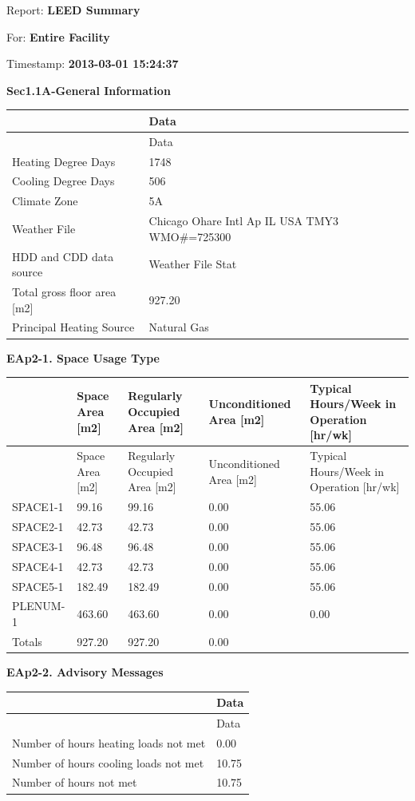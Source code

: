 Report: \textbf{LEED Summary}

For: \textbf{Entire Facility}

Timestamp: \textbf{2013-03-01 15:24:37}

\textbf{Sec1.1A-General Information}

\begin{longtable}[c]{>{\raggedright}p{2.21in}>{\raggedright}p{3.78in}}
\toprule
 & Data \tabularnewline
\midrule
\endfirsthead

\toprule
 & Data \tabularnewline
\midrule
\endhead

Heating Degree Days & 1748 \tabularnewline
Cooling Degree Days & 506 \tabularnewline
Climate Zone & 5A \tabularnewline
Weather File & Chicago Ohare Intl Ap IL USA TMY3 WMO\#=725300 \tabularnewline
HDD and CDD data source & Weather File Stat \tabularnewline
Total gross floor area [m2] & 927.20 \tabularnewline
Principal Heating Source & Natural Gas \tabularnewline
\bottomrule
\end{longtable}

\textbf{EAp2-1. Space Usage Type}

\begin{longtable}[c]{>{\raggedright}p{1.2in}>{\raggedright}p{1.2in}>{\raggedright}p{1.2in}>{\raggedright}p{1.2in}>{\raggedright}p{1.2in}}
\toprule
 & Space Area [m2] & Regularly Occupied Area [m2] & Unconditioned Area [m2] & Typical Hours/Week in Operation [hr/wk] \tabularnewline
\midrule
\endfirsthead

\toprule
 & Space Area [m2] & Regularly Occupied Area [m2] & Unconditioned Area [m2] & Typical Hours/Week in Operation [hr/wk] \tabularnewline
\midrule
\endhead

SPACE1-1 & 99.16 & 99.16 & 0.00 & 55.06 \tabularnewline
SPACE2-1 & 42.73 & 42.73 & 0.00 & 55.06 \tabularnewline
SPACE3-1 & 96.48 & 96.48 & 0.00 & 55.06 \tabularnewline
SPACE4-1 & 42.73 & 42.73 & 0.00 & 55.06 \tabularnewline
SPACE5-1 & 182.49 & 182.49 & 0.00 & 55.06 \tabularnewline
PLENUM-1 & 463.60 & 463.60 & 0.00 & 0.00 \tabularnewline
Totals & 927.20 & 927.20 & 0.00 & ~ \tabularnewline
\bottomrule
\end{longtable}

\textbf{EAp2-2. Advisory Messages}

\begin{longtable}[c]{@{}ll@{}}
\toprule
 & Data \tabularnewline
\midrule
\endfirsthead

\toprule
 & Data \tabularnewline
\midrule
\endhead

Number of hours heating loads not met & 0.00 \tabularnewline
Number of hours cooling loads not met & 10.75 \tabularnewline
Number of hours not met & 10.75 \tabularnewline
\bottomrule
\end{longtable}

